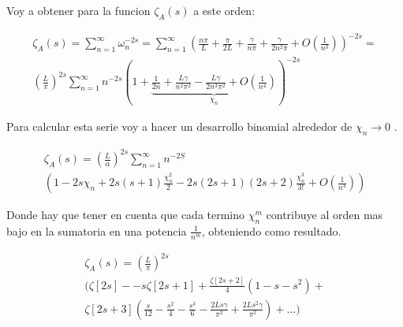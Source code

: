 Voy a obtener para la funcion $ \zeta _A (s)$ a este orden:
    
\begin{equation}
\begin{array}{cc}
    \zeta _{A} (s) =  \sum _{n=1} ^{\infty} \omega _n ^ {-2 s} =
    \sum _{n=1} ^{\infty} 
    \left(
	\frac{n \pi}{L} + 
    \frac{\pi}{2 L} +
    \frac{\gamma}{n \pi} +
    \frac{\gamma}{2 n ^2 \pi} +
    O \left(  \frac{1}{n^3} \right) 
    \right) ^{-2 s} = \\
    ( \frac{L}{\pi} ) ^{2s}    
    \sum _{n=1} ^{\infty} 
    n ^{- 2 s} 
    \left(
    1 +     
    \underbrace{
        \frac{1}{2 n} + 
        \frac{L \gamma}{n^2 \pi ^2} -
        \frac{L \gamma}{2 n ^3 \pi ^2} +
        O(\frac{1}{n ^{4}} ) } _{ \chi _n}
    \right ) ^{-2 s}
\end{array}
\end{equation}

Para calcular esta serie voy a hacer un desarrollo binomial alrededor de $\chi _n \rightarrow{0} $  .

\begin{equation}
\begin{array}{c}
\zeta _{A} (s) = 
( \frac{L}{\alpha} ) ^{2s}
\sum _{n=1} ^{\infty}
  n  ^{-2 S} \\
(
1 - 2 s \chi _n + 2 s(s+1) \frac{\chi _n ^2}{2} - 2s(2s+1)(2s+2) \frac{ \chi _n ^3}{3!}  + O( \frac{1}{n ^4}) )

\end{array}
\end{equation}

Donde hay que tener en cuenta que cada termino $\chi _{n} ^{m} $ contribuye al orden mas bajo en la sumatoria en una potencia $\frac{1}{n ^m}$, obteniendo como resultado.





\begin{equation}
\begin{array}{c}
    \zeta _A (s) = \left( \frac{L}{\pi} \right) ^{2s} \\
	\Bigg(
		\zeta [2 s] -
		-s \zeta [2s+1 ] +
		 \frac{\zeta [2s +2 ]}{4} \left( 1 - s - s^2 \right) + \\
		 \zeta [2s+3] \left(  
							\frac{s}{12} - \frac{s ^2}{4} - \frac{s ^3}{6} -
							\frac{2 L s \gamma}{\pi ^2} + \frac{2 L s^2 \gamma}{\pi ^2}
		 									\right) 
		+ ...
		\Bigg)
\end{array}
\end{equation}


